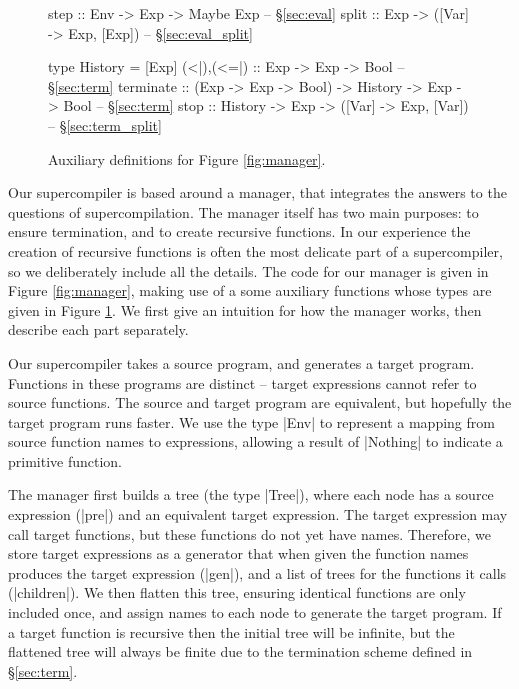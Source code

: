 \documentclass[draft]{sigplanconf}
\begin{document}
\begin{figure}
\begin{code}
step :: Env -> Exp -> Maybe Exp -- \S\ref{sec:eval}
split :: Exp -> ([Var] -> Exp, [Exp]) -- \S\ref{sec:eval_split}

type History = [Exp]
(<|),(<=|) :: Exp -> Exp -> Bool -- \S\ref{sec:term}
terminate  :: (Exp -> Exp -> Bool)
           -> History -> Exp -> Bool -- \S\ref{sec:term}
stop :: History -> Exp -> ([Var] -> Exp, [Var]) -- \S\ref{sec:term_split}
\end{code}
\caption{Auxiliary definitions for Figure \ref{fig:manager}.}
\label{fig:manager2}
\end{figure}

Our supercompiler is based around a manager, that integrates the answers to the questions of supercompilation. The manager itself has two main purposes: to ensure termination, and to create recursive functions. In our experience the creation of recursive functions is often the most delicate part of a supercompiler, so we deliberately include all the details. The code for our manager is given in Figure \ref{fig:manager}, making use of a some auxiliary functions whose types are given in Figure \ref{fig:manager2}. We first give an intuition for how the manager works, then describe each part separately.

Our supercompiler takes a source program, and generates a target program. Functions in these programs are distinct -- target expressions cannot refer to source functions. The source and target program are equivalent, but hopefully the target program runs faster. We use the type |Env| to represent a mapping from source function names to expressions, allowing a result of |Nothing| to indicate a primitive function.

The manager first builds a tree (the type |Tree|), where each node has a source expression (|pre|) and an equivalent target expression. The target expression may call target functions, but these functions do not yet have names. Therefore, we store target expressions as a generator that when given the function names produces the target expression (|gen|), and a list of trees for the functions it calls (|children|). We then flatten this tree, ensuring identical functions are only included once, and assign names to each node to generate the target program. If a target function is recursive then the initial tree will be infinite, but the flattened tree will always be finite due to the termination scheme defined in \S\ref{sec:term}.
\end{document}
